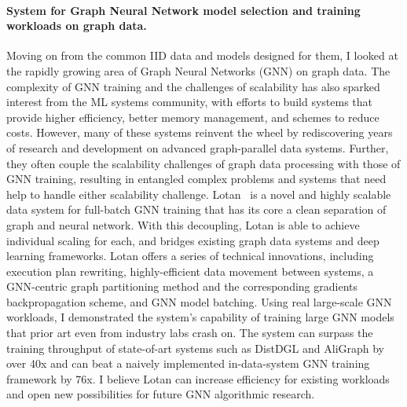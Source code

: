 \documentclass[letterpaper]{article}
\begin{document}
\paragraph{System for Graph Neural Network model selection and training workloads on graph data.}
Moving on from the common IID data and models designed for them, I looked at the rapidly growing area of Graph Neural Networks (GNN) on graph data. The complexity of GNN training and the challenges of scalability has also sparked interest from the ML systems community, with efforts to build systems that provide higher efficiency, better memory management, and schemes to reduce costs. However, many of these systems reinvent the wheel by rediscovering years of research and development on advanced graph-parallel data systems. Further, they often couple the scalability challenges of graph data processing with those of GNN training, resulting in entangled complex problems and systems that need help to handle either scalability challenge. Lotan~\cite{lotan} is a novel and highly scalable data system for full-batch GNN training that has its core a clean separation of graph and neural network. With this decoupling, Lotan is able to achieve individual scaling for each, and bridges existing graph data systems and deep learning frameworks. Lotan offers a series of technical innovations, including execution plan rewriting, highly-efficient data movement between systems, a GNN-centric graph partitioning method and the corresponding gradients backpropagation scheme, and GNN model batching. Using real large-scale GNN workloads, I demonstrated the system's capability of training large GNN models that prior art even from industry labs crash on. The system can surpass the training throughput of state-of-art systems such as DistDGL and AliGraph by over 40x and can beat a naively implemented in-data-system GNN training framework by 76x. I believe Lotan can increase efficiency for existing workloads and open new possibilities for future GNN algorithmic research.
\end{document}
